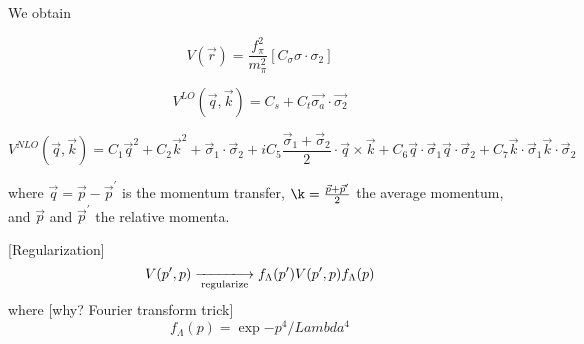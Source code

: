 We obtain

\begin{equation*}
  V(\vec{r}) = \frac{f_{\pi}^{2}}{m_{\pi}^{2}}\left[ C_{\sigma}\sigma\cdot\sigma_{2} \right]
\end{equation*}

\begin{equation*}
  V^{LO}(\vec{q}, \vec{k}) = C_{s} + C_{t}\vec{\sigma_{a}}\cdot\vec{\sigma_{2}}
\end{equation*}

\begin{equation*}
  V^{NLO}(\vec{q}, \vec{k}) = C_{1}\vec{q}^{2} + C_{2}\vec{k}^{2} + \vec{\sigma}_{1}\cdot\vec{\sigma}_{2}
  + iC_{5}\frac{\vec{\sigma}_{1}+\vec{\sigma}_{2}}{2}\cdot\vec{q}\times\vec{k}
  + C_{6}\vec{q}\cdot\vec{\sigma}_{1}\vec{q}\cdot\vec{\sigma}_{2}
  + C_{7}\vec{k}\cdot\vec{\sigma}_{1}\vec{k}\cdot\vec{\sigma}_{2}
\end{equation*}

where \(\vec{q} = \vec{p} - \vec{p}^{\prime}\) is the momentum transfer, \(\k =
\frac{\vec{p}+\vec{p}^{\prime}}{2}\) the average momentum, and \(\vec{p}\) and
\(\vec{p}^{\prime}\) the relative momenta.


[Regularization]
\begin{equation*}
  V(p^{\prime}, p)
  \xlongrightarrow[\text{regularize}]{} f_{\Lambda}(p^{\prime})V(p^{\prime}, p)f_{\Lambda}(p)
\end{equation*}
where [why? Fourier transform trick]
\begin{equation*}
  f_{\Lambda}(p) = \exp{-p^{4}/Lambda^{4}}
\end{equation*}



